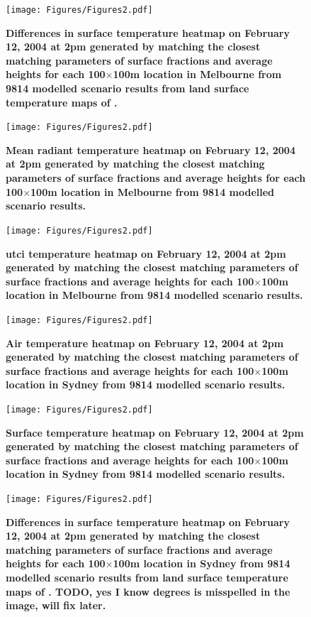 \documentclass[final,3p,times,authoryear]{elsarticle}
\begin{document}
\begin{figure}
\centering
\texttt{[image: Figures/Figures2.pdf]}
\caption{\bf Differences in surface temperature heatmap on February 12, 2004 at 2pm generated by matching the closest matching parameters of surface fractions and average heights for each 100$\times$100m location in Melbourne from 9814 modelled scenario results from land surface temperature maps of \cite{Devereux2017}.  }
 \label{fig:dist}
\end{figure}


\begin{figure}
\centering
\texttt{[image: Figures/Figures2.pdf]}
\caption{\bf Mean radiant temperature heatmap on February 12, 2004 at 2pm generated by matching the closest matching parameters of surface fractions and average heights for each 100$\times$100m location in Melbourne from 9814 modelled scenario results.  }
 \label{fig:dist}
\end{figure}



\begin{figure}
\centering
\texttt{[image: Figures/Figures2.pdf]}
\caption{\bf \gls{utci} temperature heatmap on February 12, 2004 at 2pm generated by matching the closest matching parameters of surface fractions and average heights for each 100$\times$100m location in Melbourne from 9814 modelled scenario results.  }
 \label{fig:dist}
\end{figure}




\begin{figure}
\centering
\texttt{[image: Figures/Figures2.pdf]}
\caption{\bf Air temperature heatmap on February 12, 2004 at 2pm generated by matching the closest matching parameters of surface fractions and average heights for each 100$\times$100m location in Sydney from 9814 modelled scenario results.  }
 \label{fig:dist}
\end{figure}

\begin{figure}
\centering
\texttt{[image: Figures/Figures2.pdf]}
\caption{\bf Surface temperature heatmap on February 12, 2004 at 2pm generated by matching the closest matching parameters of surface fractions and average heights for each 100$\times$100m location in Sydney from 9814 modelled scenario results.  }
 \label{fig:dist}
\end{figure}

\begin{figure}
\centering
\texttt{[image: Figures/Figures2.pdf]}
\caption{\bf Differences in surface temperature heatmap on February 12, 2004 at 2pm generated by matching the closest matching parameters of surface fractions and average heights for each 100$\times$100m location in Sydney from 9814 modelled scenario results from land surface temperature maps of \cite{Devereux2017}. TODO, yes I know degrees is misspelled in the image, will fix later. }
 \label{fig:dist}
\end{figure}
\end{document}
